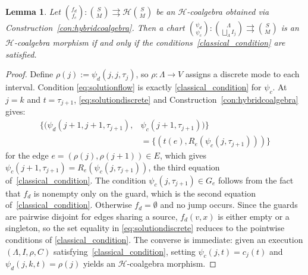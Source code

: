 \documentclass[letterpaper, 10 pt, conference]{IEEEconf}
\newtheorem{lem}[thm]{Lemma}
\theoremstyle{definition}
\newcommand{\maps}{\colon}
\newcommand{\functor}[1]{\mathcal{#1}}
\renewcommand{\H}{\functor{H}}
\begin{document}
\begin{lem}
\label{lem:solutionsequiv}
    Let $\binom{f_d}{f_c} \maps \binom SM \rightrightarrows \H\binom SM$ be an $\H$-coalgebra obtained via Construction~\ref{con:hybridcoalgebra}. Then a chart $\binom{\psi_d}{\psi_c} \maps \binom{\Lambda}{\bigsqcup_\Lambda I_j} \rightrightarrows \binom SM$ is an $\H$-coalgebra morphism if and only if the conditions~\eqref{classical_condition} are satisfied.
\end{lem}
\begin{proof}
    Define $\rho(j) := \psi_d(j, j, \tau_j)$, so $\rho \colon \Lambda \to V$ assigns a discrete mode to each interval.
    Condition \eqref{eq:solutionflow} is exactly \eqref{classical_condition} for $\psi_c$. 
    At $j = k$ and $t = \tau_{j+1}$, \eqref{eq:solutiondiscrete} and Construction~\ref{con:hybridcoalgebra} gives:
    \begin{align*}
        \{(\psi_d(j+1, j+1, \tau_{j+1}), &\psi_c(j+1, \tau_{j+1}))\} 
        \\&= \{(t(e), R_e(\psi_c(j, \tau_{j+1})))\}
    \end{align*}
    for the edge $e = (\rho(j), \rho(j+1)) \in E$, which gives $\psi_c(j+1, \tau_{j+1}) = R_e(\psi_c(j, \tau_{j+1}))$, the third equation of~\eqref{classical_condition}. The condition $\psi_c(j, \tau_{j+1}) \in G_e$ follows from the fact that $f_d$ is nonempty only on the guard, which is the second equation of~\eqref{classical_condition}. Otherwise $f_d = \emptyset$ and no jump occurs. Since the guards are pairwise disjoint for edges sharing a source, $f_d(v,x)$ is either empty or a singleton, so the set equality in \eqref{eq:solutiondiscrete} reduces to the pointwise conditions of \eqref{classical_condition}. The converse is immediate: given an execution $(\Lambda, I, \rho, C)$ satisfying~\eqref{classical_condition}, setting $\psi_c(j,t) = c_j(t)$ and $\psi_d(j,k,t) = \rho(j)$ yields an $\mathcal{H}$-coalgebra morphism.
\end{proof}


\end{document}
